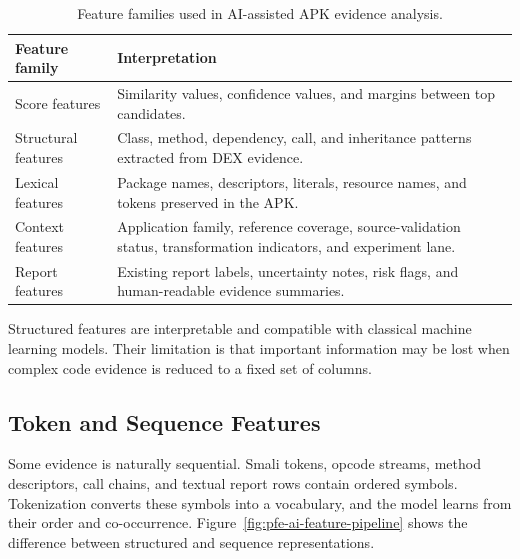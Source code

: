 \begin{table}[H]
\centering
\caption{Feature families used in AI-assisted APK evidence analysis.}
\label{tab:pfe-ai-feature-types}
\begin{tabularx}{\textwidth}{L{0.24\textwidth}X}
\toprule
\textbf{Feature family} & \textbf{Interpretation}\\
\midrule
Score features & Similarity values, confidence values, and margins between
top candidates.\\
Structural features & Class, method, dependency, call, and inheritance
patterns extracted from DEX evidence.\\
Lexical features & Package names, descriptors, literals, resource names, and
tokens preserved in the APK.\\
Context features & Application family, reference coverage, source-validation
status, transformation indicators, and experiment lane.\\
Report features & Existing report labels, uncertainty notes, risk flags, and
human-readable evidence summaries.\\
\bottomrule
\end{tabularx}
\end{table}

Structured features are interpretable and compatible with classical machine
learning models. Their limitation is that important information may be lost
when complex code evidence is reduced to a fixed set of columns.

\subsection{Token and Sequence Features}

Some evidence is naturally sequential. Smali tokens, opcode streams, method
descriptors, call chains, and textual report rows contain ordered symbols.
Tokenization converts these symbols into a vocabulary, and the model learns
from their order and co-occurrence. Figure~\ref{fig:pfe-ai-feature-pipeline}
shows the difference between structured and sequence representations.


